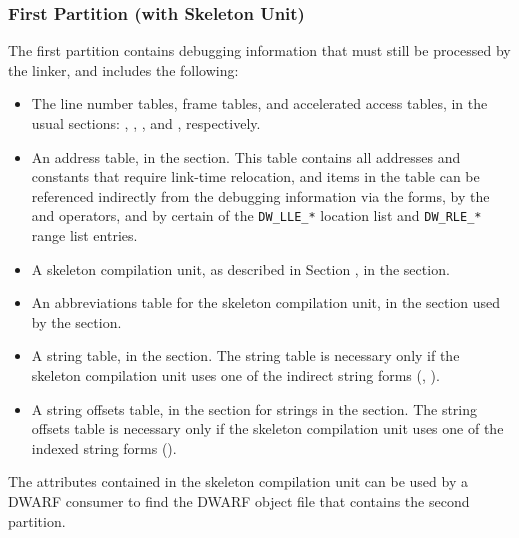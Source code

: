 \subsubsection{First Partition (with Skeleton Unit)}
The first partition contains
debugging information that must still be processed by the linker,
and includes the following:
\begin{itemize}
\item
The line number tables, frame tables, and
accelerated access tables, in the usual sections:
\dotdebugline, \dotdebuglinestr, 
\dotdebugframe, \dotdebugnames{} and \dotdebugaranges,
respectively.
\item
An address table, in the \dotdebugaddr{} section. This table
contains all addresses and constants that require
link-time relocation, and items in the table can be
referenced indirectly from the debugging information via
the \DWFORMaddrxXNand{} forms, 
by the \DWOPaddrx{} and \DWOPconstx{} operators, and
by certain of the \texttt{DW\_LLE\_*} location list
and \texttt{DW\_RLE\_*} range list entries.
\item
A skeleton compilation unit, as described in Section
, 
in the \dotdebuginfo{} section.
\item
An abbreviations table for the skeleton compilation unit,
in the \dotdebugabbrev{} section
used by the \dotdebuginfo{} section.

\item
A string table, in the \dotdebugstr{} section. The string
table is necessary only if the skeleton compilation unit
uses one of the indirect string forms (\DWFORMstrp{}, 
\DWFORMstrxXNor).

\item
A string offsets table, in the \dotdebugstroffsets{}
section for strings in the \dotdebugstr{} section. 
The string offsets table is necessary only if
the skeleton compilation unit uses 
one of the indexed string forms (\DWFORMstrxXN).
\end{itemize}
The attributes contained in the skeleton compilation
unit can be used by a DWARF consumer to find the 
DWARF object file that contains the second partition.

